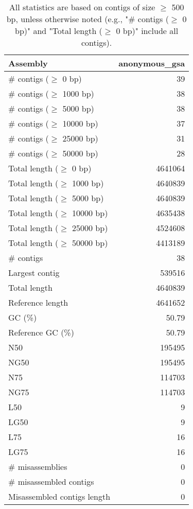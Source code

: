 \documentclass[12pt,a4paper]{article}
\begin{document}
\begin{table}[ht]
\begin{center}
\caption{All statistics are based on contigs of size $\geq$ 500 bp, unless otherwise noted (e.g., "\# contigs ($\geq$ 0 bp)" and "Total length ($\geq$ 0 bp)" include all contigs).}
\begin{tabular}{|l*{1}{|r}|}
\hline
Assembly & anonymous\_gsa \\ \hline
\# contigs ($\geq$ 0 bp) & 39 \\ \hline
\# contigs ($\geq$ 1000 bp) & 38 \\ \hline
\# contigs ($\geq$ 5000 bp) & 38 \\ \hline
\# contigs ($\geq$ 10000 bp) & 37 \\ \hline
\# contigs ($\geq$ 25000 bp) & 31 \\ \hline
\# contigs ($\geq$ 50000 bp) & 28 \\ \hline
Total length ($\geq$ 0 bp) & 4641064 \\ \hline
Total length ($\geq$ 1000 bp) & 4640839 \\ \hline
Total length ($\geq$ 5000 bp) & 4640839 \\ \hline
Total length ($\geq$ 10000 bp) & 4635438 \\ \hline
Total length ($\geq$ 25000 bp) & 4524608 \\ \hline
Total length ($\geq$ 50000 bp) & 4413189 \\ \hline
\# contigs & 38 \\ \hline
Largest contig & 539516 \\ \hline
Total length & 4640839 \\ \hline
Reference length & 4641652 \\ \hline
GC (\%) & 50.79 \\ \hline
Reference GC (\%) & 50.79 \\ \hline
N50 & 195495 \\ \hline
NG50 & 195495 \\ \hline
N75 & 114703 \\ \hline
NG75 & 114703 \\ \hline
L50 & 9 \\ \hline
LG50 & 9 \\ \hline
L75 & 16 \\ \hline
LG75 & 16 \\ \hline
\# misassemblies & 0 \\ \hline
\# misassembled contigs & 0 \\ \hline
Misassembled contigs length & 0 \\ \hline

\end{tabular}
\end{center}
\end{table}
\end{document}
